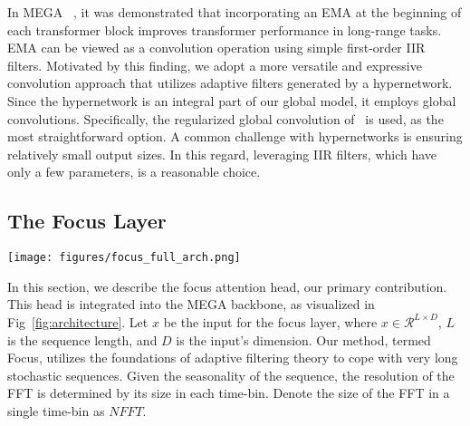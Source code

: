 \documentclass[11pt]{article}
\begin{document}
 In MEGA ~\cite{ma2022mega}, it was demonstrated that incorporating an EMA at the beginning of each transformer block improves transformer performance in long-range tasks. EMA can be viewed as a convolution operation using simple first-order IIR filters. Motivated by this finding, we adopt a more versatile and expressive convolution approach that utilizes adaptive filters generated by a hypernetwork. Since the hypernetwork is an integral part of our global model, it employs global convolutions. Specifically, the regularized global convolution of~\cite{fu2023simple} is used, as the most straightforward option. A common challenge with hypernetworks is ensuring relatively small output sizes. In this regard, leveraging IIR filters, which have only a few parameters, is a reasonable choice.

\subsection{The Focus Layer}
\begin{figure*}[t]
    \centering
    \texttt{[image: figures/focus\_full\_arch.png]}
    \caption{Focus Architecture: (a) The architecture of a single head. (b) The obtained layer. (c) The entire model. The architecture of the model and layer are defined similarly to MEGA~\cite{ma2022mega}. Blocks in blue are not learned, while blocks in red are learned parameters. $S2P$ (serial to parallel) and $P2S$ (parallel to serial) are the chunking and the de-chunking operations, respectively.}
    \label{fig:architecture}
\end{figure*}

In this section, we describe the focus attention head, our primary contribution. This head is integrated into the MEGA backbone, as visualized in Fig~\ref{fig:architecture}.
Let $x$ be the input for the focus layer, where $x\in \mathcal{R}^{L\times D}$, $L$ is the sequence length, and $D$ is the input's dimension.
Our method, termed Focus, utilizes the foundations of adaptive filtering theory to cope with very long stochastic sequences.
Given the seasonality of the sequence, the resolution of the FFT is determined by its size in each time-bin. Denote the size of the FFT in a single time-bin as $NFFT$.
\end{document}
